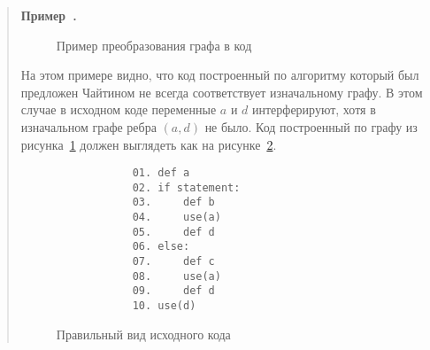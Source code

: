 \documentclass[12pt]{article}
\newcounter{example}[section]
\newenvironment{example}[1][]{\refstepcounter{example}\par\medskip\noindent\begin{quote}
\textbf{Пример~\theexample. #1}\rmfamily}{\end{quote}\medskip}
\begin{document}
\begin{example}

    \begin{figure}
        \centering
    \caption{Пример преобразования графа в код}
    \label{fig:ex2}
    \end{figure}

    На этом примере видно, что код построенный по алгоритму который был предложен Чайтином не
    всегда соответствует изначальному графу. В этом случае в исходном коде переменные
    $a$ и $d$ интерферируют, хотя в изначальном графе ребра $(a, d)$ не было. Код построенный
    по графу из рисунка~\ref{fig:ex2} должен выглядеть как на рисунке~\ref{fig:right_ex2}.

    \begin{figure}
        \centering
        \lstset{basicstyle=\ttfamily\small, frame=single}
        \begin{lstlisting}
            01. def a
            02. if statement:
            03.     def b
            04.     use(a)
            05.     def d 
            06. else:
            07.     def c
            08.     use(a)
            09.     def d
            10. use(d)
        \end{lstlisting}
        \caption{Правильный вид исходного кода}
        \label{fig:right_ex2}
    \end{figure}
\end{example}
\end{document}

